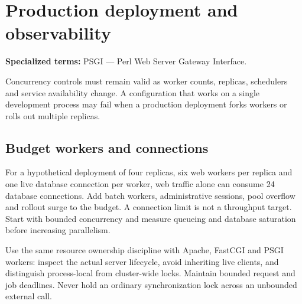\chapter{Production deployment and observability}
\par\smallskip\noindent\textbf{Specialized terms:} PSGI --- Perl Web Server Gateway Interface.\par\smallskip
\label{ch:enterprise-operations}

Concurrency controls must remain valid as worker counts, replicas,
schedulers and service availability change. A configuration that works on
a single development process may fail when a production deployment forks
workers or rolls out multiple replicas.


\section{Budget workers and connections}
For a hypothetical deployment of four replicas, six web workers per
replica and one live database connection per worker, web traffic alone can
consume 24 database connections. Add batch workers, administrative sessions,
pool overflow and rollout surge to the budget. A connection limit is not
a throughput target. Start with bounded concurrency and measure queueing
and database saturation before increasing parallelism.

Use the same resource ownership discipline with Apache, FastCGI and PSGI
workers: inspect the actual server lifecycle, avoid inheriting live clients,
and distinguish process-local from cluster-wide locks. Maintain bounded
request and job deadlines. Never hold an ordinary synchronization lock
across an unbounded external call.

